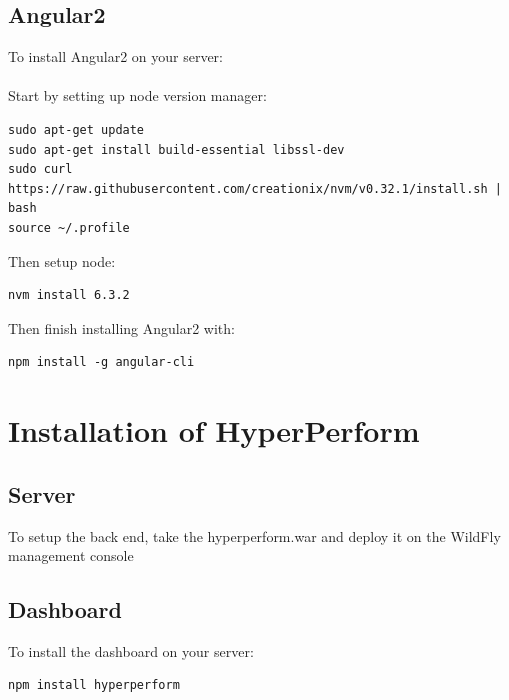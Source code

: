 \documentclass[11pt,a4paper]{article}
\begin{document}
\subsection{Angular2}
To install Angular2 on your server: \\\\
Start by setting up node version manager:
\begin{lstlisting}
sudo apt-get update
sudo apt-get install build-essential libssl-dev
sudo curl https://raw.githubusercontent.com/creationix/nvm/v0.32.1/install.sh | bash
source ~/.profile
\end{lstlisting}
Then setup node:
\begin{lstlisting}
nvm install 6.3.2
\end{lstlisting}
Then finish installing Angular2 with:
\begin{lstlisting}
npm install -g angular-cli
\end{lstlisting}

\pagebreak

\section{Installation of HyperPerform}

\subsection{Server}
To setup the back end, take the hyperperform.war and deploy it on the WildFly management console

\subsection{Dashboard}
To install the dashboard on your server:
\begin{lstlisting}
npm install hyperperform
\end{lstlisting}
\end{document}
